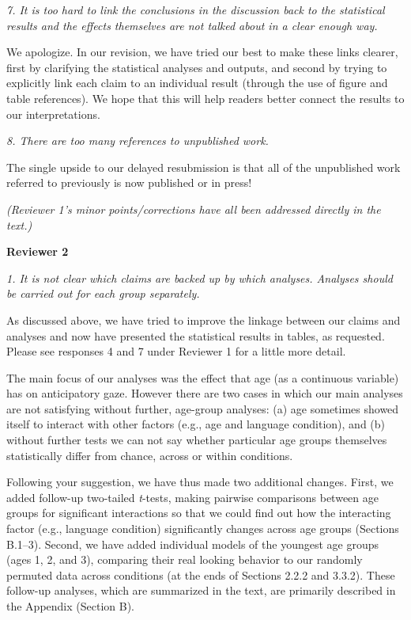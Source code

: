 \documentclass[11pt,a4paper]{letter} %
\begin{document}
\begin{letter}{}
\smallskip

\noindent \textit{7. It is too hard to link the conclusions in the discussion back to the statistical results and the effects themselves are not talked about in a clear enough way.}

\noindent We apologize. In our revision, we have tried our best to make these links clearer, first by clarifying the statistical analyses and outputs, and second by trying to explicitly link each claim to an individual result (through the use of figure and table references). We hope that this will help readers better connect the results to our interpretations.

\smallskip

\noindent \textit{8. There are too many references to unpublished work.}

\noindent The single upside to our delayed resubmission is that all of the unpublished work referred to previously is now published or in press!

\smallskip

\noindent \textit{(Reviewer 1's minor points/corrections have all been addressed directly in the text.)}

\bigskip

\noindent \textbf{Reviewer 2}

\noindent \textit{1. It is not clear which claims are backed up by which analyses. Analyses should be carried out for each group separately.}

\noindent As discussed above, we have tried to improve the linkage between our claims and analyses and now have presented the statistical results in tables, as requested. Please see responses 4 and 7 under Reviewer 1 for a little more detail. 

The main focus of our analyses was the effect that age (as a continuous variable) has on anticipatory gaze. However there are two cases in which our main analyses are not satisfying without further, age-group analyses: (a) age sometimes showed itself to interact with other factors (e.g., age and language condition), and (b) without further tests we can not say whether particular age groups themselves statistically differ from chance, across or within conditions. 

Following your suggestion, we have thus made two additional changes. First, we added follow-up two-tailed \textit{t}-tests, making pairwise comparisons between age groups for significant interactions so that we could find out how the interacting factor (e.g., language condition) significantly changes across age groups (Sections B.1--3). Second, we have added individual models of the youngest age groups (ages 1, 2, and 3), comparing their real looking behavior to our randomly permuted data across conditions (at the ends of Sections 2.2.2 and 3.3.2). These follow-up analyses, which are summarized in the text, are primarily described in the Appendix (Section B).


\end{letter}
\end{document}

